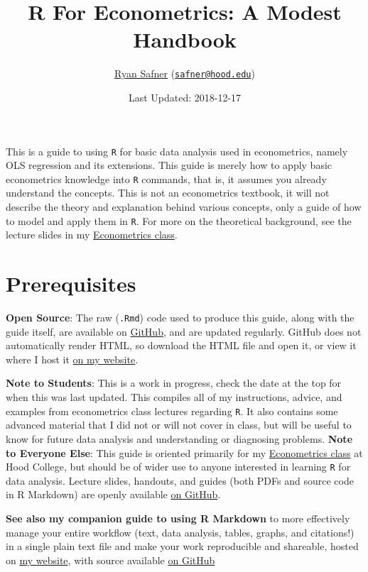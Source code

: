 \documentclass[]{book}
\title{R For Econometrics: A Modest Handbook}
\author{\href{http://ryansafner.com}{Ryan Safner}
(\href{mailto:safner@hood.edu}{\nolinkurl{safner@hood.edu}})}
\date{Last Updated: 2018-12-17}
\theoremstyle{definition}
\theoremstyle{definition}
\theoremstyle{definition}
\theoremstyle{remark}
\begin{document}
\maketitle

{
\setcounter{tocdepth}{1}
\tableofcontents
}
This is a guide to using \texttt{R} for basic data analysis used in
econometrics, namely OLS regression and its extensions. This guide is
merely how to apply basic econometrics knowledge into \texttt{R}
commands, that is, it assumes you already understand the concepts. This
is not an econometrics textbook, it will not describe the theory and
explanation behind various concepts, only a guide of how to model and
apply them in \texttt{R}. For more on the theoretical background, see
the lecture slides in my
\href{http://ryansafner.com/courses/econ480}{Econometrics class}.

\chapter{Prerequisites}\label{prerequisites}

\textbf{Open Source}: The raw (\texttt{.Rmd}) code used to produce this
guide, along with the guide itself, are available on
\href{http://github.com/ryansafner/R4EH}{GitHub}, and are updated
regularly. GitHub does not automatically render HTML, so download the
HTML file and open it, or view it where I host it
\href{http://ryansafner.com/tutorial/R4EH.html}{on my website}.

\textbf{Note to Students}: This is a work in progress, check the date at
the top for when this was last updated. This compiles all of my
instructions, advice, and examples from econometrics class lectures
regarding \texttt{R}. It also contains some advanced material that I did
not or will not cover in class, but will be useful to know for future
data analysis and understanding or diagnosing problems. \textbf{Note to
Everyone Else}: This guide is oriented primarily for my
\href{http://ryansafner.com/courses/econ480}{Econometrics class} at Hood
College, but should be of wider use to anyone interested in learning
\texttt{R} for data analysis. Lecture slides, handouts, and guides (both
PDFs and source code in R Markdown) are openly available
\href{http://github.com/ryansafner/ECON480/}{on GitHub}.

\textbf{See also my companion guide to using R Markdown} to more
effectively manage your entire workflow (text, data analysis, tables,
graphs, and citations!) in a single plain text file and make your work
reproducible and shareable, hosted on
\href{http://ryansafner.com/tutorial/RMDG}{my website}, with source
available \href{http://github.com/ryansafner/RMDG}{on GitHub}
\end{document}
